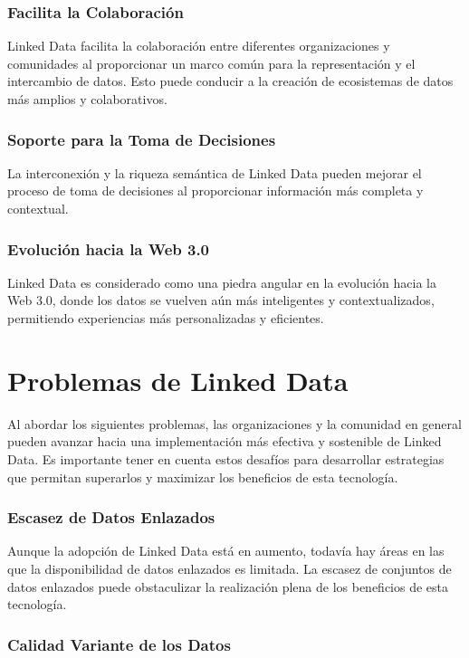 \documentclass[11pt]{report}
\begin{document}
\subsection*{Facilita la Colaboración}

		Linked Data facilita la colaboración entre diferentes organizaciones y comunidades al proporcionar un marco común para la representación y el intercambio de datos. Esto puede conducir a la creación de ecosistemas de datos más amplios y colaborativos.
\subsection*{Soporte para la Toma de Decisiones}

		La interconexión y la riqueza semántica de Linked Data pueden mejorar el proceso de toma de decisiones al proporcionar información más completa y contextual.
\subsection*{Evolución hacia la Web 3.0}

		Linked Data es considerado como una piedra angular en la evolución hacia la Web 3.0, donde los datos se vuelven aún más inteligentes y contextualizados, permitiendo experiencias más personalizadas y eficientes.

\chapter{Problemas de Linked Data}
Al abordar los siguientes problemas, las organizaciones y la comunidad en general pueden avanzar hacia una implementación más efectiva y sostenible de Linked Data. Es importante tener en cuenta estos desafíos para desarrollar estrategias que permitan superarlos y maximizar los beneficios de esta tecnología.

\subsection*{Escasez de Datos Enlazados}

		Aunque la adopción de Linked Data está en aumento, todavía hay áreas en las que la disponibilidad de datos enlazados es limitada. La escasez de conjuntos de datos enlazados puede obstaculizar la realización plena de los beneficios de esta tecnología.
\subsection*{Calidad Variante de los Datos}
\end{document}
